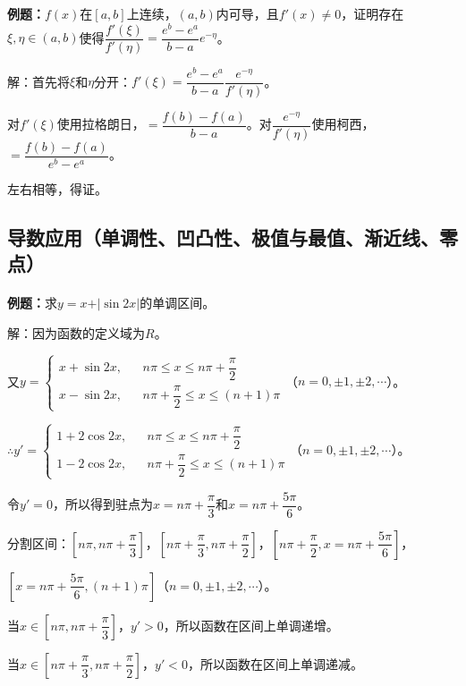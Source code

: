 \textbf{例题：}$f(x)$在$[a,b]$上连续，$(a,b)$内可导，且$f'(x)\neq0$，证明存在$\xi,\eta\in(a,b)$使得$\dfrac{f'(\xi)}{f'(\eta)}=\dfrac{e^b-e^a}{b-a}e^{-\eta}$。

解：首先将$\xi$和$\eta$分开：$f'(\xi)=\dfrac{e^b-e^a}{b-a}\dfrac{e^{-\eta}}{f'(\eta)}$。

对$f'(\xi)$使用拉格朗日，$=\dfrac{f(b)-f(a)}{b-a}$。对$\dfrac{e^{-\eta}}{f'(\eta)}$使用柯西，$=\dfrac{f(b)-f(a)}{e^b-e^a}$。

左右相等，得证。

\subsection{导数应用（单调性、凹凸性、极值与最值、渐近线、零点）}

\paragraph{}

\textbf{例题：}求$y=x+\vert\sin 2x\vert$的单调区间。

解：因为函数的定义域为$R$。

又$y=\left\{\begin{array}{lcl}
    x+\sin 2x, & & n\pi\leqslant x\leqslant n\pi+\dfrac{\pi}{2} \\
    x-\sin 2x, & &n\pi+\dfrac{\pi}{2}\leqslant x\leqslant (n+1)\pi
\end{array}\right.$（$n=0,\pm 1,\pm2,\cdots$）。

$\therefore y'=\left\{\begin{array}{lcl}
    1+2\cos 2x, & & n\pi\leqslant x\leqslant n\pi+\dfrac{\pi}{2} \\
    1-2\cos 2x, & &n\pi+\dfrac{\pi}{2}\leqslant x\leqslant (n+1)\pi
\end{array}\right.$（$n=0,\pm 1,\pm2,\cdots$）。

令$y'=0$，所以得到驻点为$x=n\pi+\dfrac{\pi}{3}$和$x=n\pi+\dfrac{5\pi}{6}$。

分割区间：$\left[n\pi,n\pi+\dfrac{\pi}{3}\right]$，$\left[n\pi+\dfrac{\pi}{3},n\pi+\dfrac{\pi}{2}\right]$，$\left[n\pi+\dfrac{\pi}{2},x=n\pi+\dfrac{5\pi}{6}\right]$，

$\left[x=n\pi+\dfrac{5\pi}{6},(n+1)\pi\right]$（$n=0,\pm 1,\pm2,\cdots$）。

当$x\in\left[n\pi,n\pi+\dfrac{\pi}{3}\right]$，$y'>0$，所以函数在区间上单调递增。

当$x\in\left[n\pi+\dfrac{\pi}{3},n\pi+\dfrac{\pi}{2}\right]$，$y'<0$，所以函数在区间上单调递减。

